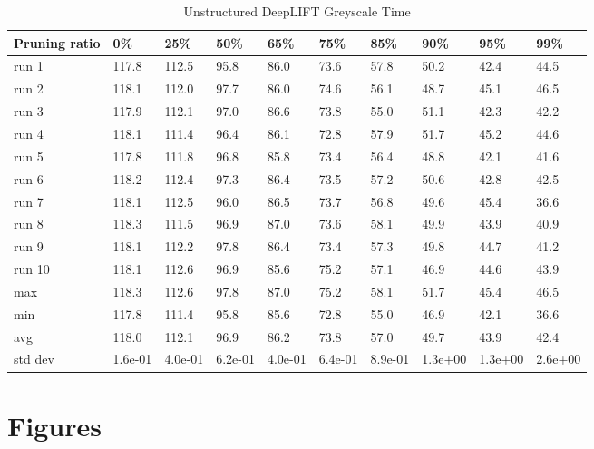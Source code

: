 \documentclass[journal,onecolumn,12pt]{IEEEtran}
\begin{document}
\begin{table}[htbp]
    \caption{Unstructured DeepLIFT Greyscale Time}
    \begin{center}
    \begin{tabular}{ |p{2cm}|p{1cm}|p{1cm}|p{1cm}|p{1cm}|p{1cm}|p{1cm}|p{1cm}|p{1cm}|p{1cm}|  }
     \hline
     Pruning ratio  & 0\% & 25\%& 50\%& 65\%& 75\%& 85\%& 90\%& 95\%& 99\%\\
     \hline
     run 1&117.8&112.5&95.8&86.0&73.6&57.8&50.2&42.4&44.5\\
     run 2&118.1&112.0&97.7&86.0&74.6&56.1&48.7&45.1&46.5\\
     run 3&117.9&112.1&97.0&86.6&73.8&55.0&51.1&42.3&42.2\\
     run 4&118.1&111.4&96.4&86.1&72.8&57.9&51.7&45.2&44.6\\
     run 5&117.8&111.8&96.8&85.8&73.4&56.4&48.8&42.1&41.6\\
     run 6&118.2&112.4&97.3&86.4&73.5&57.2&50.6&42.8&42.5\\
     run 7&118.1&112.5&96.0&86.5&73.7&56.8&49.6&45.4&36.6\\
     run 8&118.3&111.5&96.9&87.0&73.6&58.1&49.9&43.9&40.9\\
     run 9&118.1&112.2&97.8&86.4&73.4&57.3&49.8&44.7&41.2\\
     run 10&118.1&112.6&96.9&85.6&75.2&57.1&46.9&44.6&43.9\\
     \hline
        max     &118.3&112.6&97.8&87.0&75.2&58.1&51.7&45.4&46.5\\
        min     &117.8&111.4&95.8&85.6&72.8&55.0&46.9&42.1&36.6\\
        avg     &118.0&112.1&96.9&86.2&73.8&57.0&49.7&43.9&42.4\\
        std dev &1.6e-01&4.0e-01&6.2e-01&4.0e-01&6.4e-01&8.9e-01&1.3e+00&1.3e+00&2.6e+00\\
     \hline
    \end{tabular}
    \end{center}
    \label{tab:a10}
\end{table}

\clearpage
\section{Figures}
\label{appendix:figures}
\end{document}

